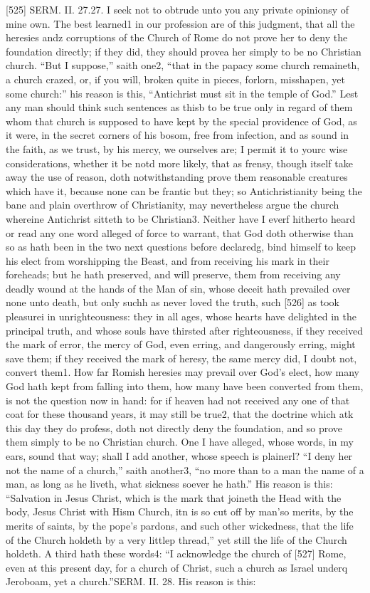 [525]
SERM. II. 27.27. I seek not to obtrude unto you any private opinionsy of mine own. The best learned1 in our profession are of this judgment, that all the heresies andz corruptions of the Church of Rome do not prove her to deny the foundation directly; if they did, they should provea her simply to be no Christian church. “But I suppose,” saith one2, “that in the papacy some church remaineth, a church crazed, or, if you will, broken quite in pieces, forlorn, misshapen, yet some church:” his reason is this, “Antichrist must sit in the temple of God.” Lest any man should think such sentences as thisb to be true only in regard of them whom that church is supposed to have kept by the special providence of God, as it were, in the secret corners of his bosom, free from infection, and as sound in the faith, as we trust, by his mercy, we ourselves are; I permit it to yourc wise considerations, whether it be notd more likely, that as frensy, though itself take away the use of reason, doth notwithstanding prove them reasonable creatures which have it, because none can be frantic but they; so Antichristianity being the bane and plain overthrow of Christianity, may nevertheless argue the church whereine Antichrist sitteth to be Christian3. Neither have I everf hitherto heard or read any one word alleged of force to warrant, that God doth otherwise than so as hath been in the two next questions before declaredg, bind himself to keep his elect from worshipping the Beast, and from receiving his mark in their foreheads; but he hath preserved, and will preserve, them from receiving any deadly wound at the hands of the Man of sin, whose deceit hath prevailed over none unto death, but only suchh as never loved the truth, such [526] as took pleasurei in unrighteousness: they in all ages, whose hearts have delighted in the principal truth, and whose souls have thirsted after righteousness, if they received the mark of error, the mercy of God, even erring, and dangerously erring, might save them; if they received the mark of heresy, the same mercy did, I doubt not, convert them1. How far Romish heresies may prevail over God’s elect, how many God hath kept from falling into them, how many have been converted from them, is not the question now in hand: for if heaven had not received any one of that coat for these thousand years, it may still be true2, that the doctrine which atk this day they do profess, doth not directly deny the foundation, and so prove them simply to be no Christian church. One I have alleged, whose words, in my ears, sound that way; shall I add another, whose speech is plainerl? “I deny her not the name of a church,” saith another3, “no more than to a man the name of a man, as long as he liveth, what sickness soever he hath.” His reason is this: “Salvation in Jesus Christ, which is the mark that joineth the Head with the body, Jesus Christ with Hism Church, itn is so cut off by man’so merits, by the merits of saints, by the pope’s pardons, and such other wickedness, that the life of the Church holdeth by a very littlep thread,” yet still the life of the Church holdeth. A third hath these words4: “I acknowledge the church of [527] Rome, even at this present day, for a church of Christ, such a church as Israel underq Jeroboam, yet a church.”SERM. II. 28. His reason is this: 